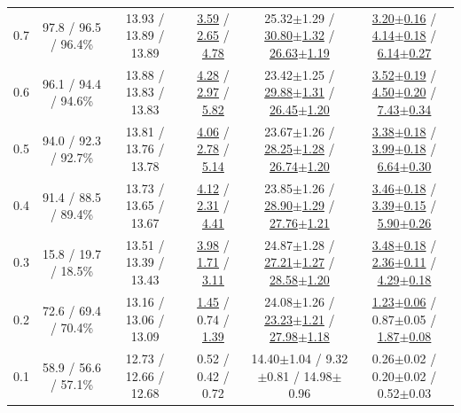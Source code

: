 \begin{table}[!t]
\begin{tabular}{cccccc}
0.7 & 97.8 / 96.5 / 96.4\% & 13.93 / 13.89 / 13.89 & \underline{3.59} / \underline{2.65} / \underline{4.78} & 25.32{\scriptsize$\pm$1.29} / \underline{30.80{\scriptsize$\pm$1.32}} / \underline{26.63{\scriptsize$\pm$1.19}} & \underline{3.20{\scriptsize$\pm$0.16}} / \underline{4.14{\scriptsize$\pm$0.18}} / \underline{6.14{\scriptsize$\pm$0.27}} \\
0.6 & 96.1 / 94.4 / 94.6\% & 13.88 / 13.83 / 13.83 & \underline{4.28} / \underline{2.97} / \underline{5.82} & 23.42{\scriptsize$\pm$1.25} / \underline{29.88{\scriptsize$\pm$1.31}} / \underline{26.45{\scriptsize$\pm$1.20}} & \underline{3.52{\scriptsize$\pm$0.19}} / \underline{4.50{\scriptsize$\pm$0.20}} / \underline{7.43{\scriptsize$\pm$0.34}} \\
0.5 & 94.0 / 92.3 / 92.7\% & 13.81 / 13.76 / 13.78 & \underline{4.06} / \underline{2.78} / \underline{5.14} & 23.67{\scriptsize$\pm$1.26} / \underline{28.25{\scriptsize$\pm$1.28}} / \underline{26.74{\scriptsize$\pm$1.20}} & \underline{3.38{\scriptsize$\pm$0.18}} / \underline{3.99{\scriptsize$\pm$0.18}} / \underline{6.64{\scriptsize$\pm$0.30}} \\
0.4 & 91.4 / 88.5 / 89.4\% & 13.73 / 13.65 / 13.67 & \underline{4.12} / \underline{2.31} / \underline{4.41} & 23.85{\scriptsize$\pm$1.26} / \underline{28.90{\scriptsize$\pm$1.29}} / \underline{27.76{\scriptsize$\pm$1.21}} & \underline{3.46{\scriptsize$\pm$0.18}} / \underline{3.39{\scriptsize$\pm$0.15}} / \underline{5.90{\scriptsize$\pm$0.26}} \\
0.3 & 15.8 / 19.7 / 18.5\% & 13.51 / 13.39 / 13.43 & \underline{3.98} / \underline{1.71} / \underline{3.11} & 24.87{\scriptsize$\pm$1.28} / \underline{27.21{\scriptsize$\pm$1.27}} / \underline{28.58{\scriptsize$\pm$1.20}} & \underline{3.48{\scriptsize$\pm$0.18}} / \underline{2.36{\scriptsize$\pm$0.11}} / \underline{4.29{\scriptsize$\pm$0.18}} \\
0.2 & 72.6 / 69.4 / 70.4\% & 13.16 / 13.06 / 13.09 & \underline{1.45} / 0.74 / \underline{1.39} & 24.08{\scriptsize$\pm$1.26} / \underline{23.23{\scriptsize$\pm$1.21}} / \underline{27.98{\scriptsize$\pm$1.18}} & \underline{1.23{\scriptsize$\pm$0.06}} / 0.87{\scriptsize$\pm$0.05} / \underline{1.87{\scriptsize$\pm$0.08}} \\
0.1 & 58.9 / 56.6 / 57.1\% & 12.73 / 12.66 / 12.68 & 0.52 / 0.42 / 0.72 & 14.40{\scriptsize$\pm$1.04} / 9.32{\scriptsize$\pm$0.81} / 14.98{\scriptsize$\pm$0.96} & 0.26{\scriptsize$\pm$0.02} / 0.20{\scriptsize$\pm$0.02} / 0.52{\scriptsize$\pm$0.03} \\
\bottomrule
\end{tabular}
\vspace{-3mm}
\label{tab:efficiency_cross_dataset}
\end{table}

